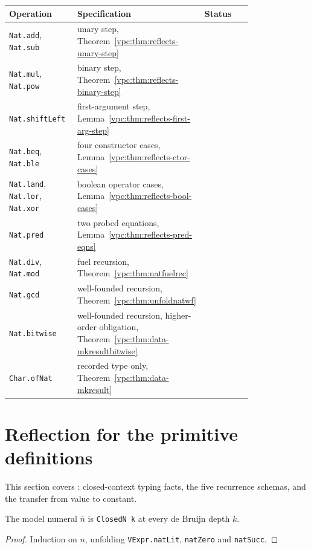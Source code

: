 \par\smallskip\noindent
\begin{tabular}{p{0.28\linewidth}p{0.52\linewidth}l}
\toprule
Operation & Specification & Status\\
\midrule
\texttt{Nat.add}, \texttt{Nat.sub} & unary step, Theorem~\ref{vpc:thm:reflects-unary-step} & \stTainted{}\\
\texttt{Nat.mul}, \texttt{Nat.pow} & binary step, Theorem~\ref{vpc:thm:reflects-binary-step} & \stTainted{}\\
\texttt{Nat.shiftLeft} & first-argument step, Lemma~\ref{vpc:thm:reflects-first-arg-step} & \stTainted{}\\
\texttt{Nat.beq}, \texttt{Nat.ble} & four constructor cases, Lemma~\ref{vpc:thm:reflects-ctor-cases} & \stTainted{}\\
\texttt{Nat.land}, \texttt{Nat.lor}, \texttt{Nat.xor} & boolean operator cases, Lemma~\ref{vpc:thm:reflects-bool-cases} & \stTainted{}\\
\texttt{Nat.pred} & two probed equations, Lemma~\ref{vpc:thm:reflects-pred-eqns} & \stTainted{}\\
\texttt{Nat.div}, \texttt{Nat.mod} & fuel recursion, Theorem~\ref{vpc:thm:natfuelrec} & \stProved{}\\
\texttt{Nat.gcd} & well-founded recursion, Theorem~\ref{vpc:thm:unfoldnatwf} & \stProved{}\\
\texttt{Nat.bitwise} & well-founded recursion, higher-order obligation, Theorem~\ref{vpc:thm:data-mkresultbitwise} & \stTainted{}\\
\texttt{Char.ofNat} & recorded type only, Theorem~\ref{vpc:thm:data-mkresult} & \stProved{}\\
\bottomrule
\end{tabular}\par\smallskip

\section{Reflection for the primitive definitions}

This section covers : closed-context typing facts, the
five recurrence schemas, and the transfer from value to constant.

\begin{lemma}
\label{vpc:lem:prim-closedn-natlit}\leanok
{}

 The model numeral $\overline{n}$ is \texttt{ClosedN k} at every de Bruijn depth
$k$.
\end{lemma}
\begin{proof}\leanok
{} Induction on $n$, unfolding \texttt{VExpr.natLit}, \texttt{natZero} and
\texttt{natSucc}.
\end{proof}

